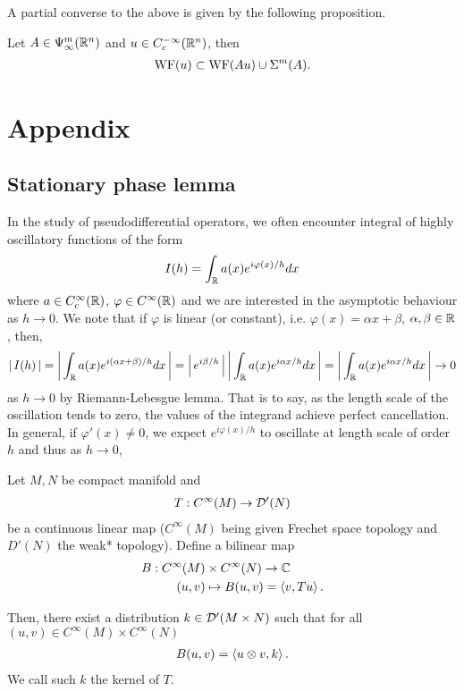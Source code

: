 \documentclass{article}
\begin{document}
A partial converse to the above is given by the following proposition. \\

\begin{fprop}
    Let $A \in \Psi^m_\infty(\R^n)$ and $u \in C^{- \infty}_c(\R^n)$, then 
    \begin{align*}
    \WF(u) \subset \WF(Au) \cup \Char^m(A).
    \end{align*}
\end{fprop}

\section{Appendix}
\subsection{Stationary phase lemma} 
In the study of pseudodifferential operators, we often encounter integral of highly oscillatory functions of the form
    \begin{align*}
    I(h) = \int_\R a(x) e^{i \varphi(x) /h} dx
    \end{align*}
where $a \in C^\infty_c(\R)$, $\varphi \in C^\infty(\R)$ and we are interested in the asymptotic behaviour as $h \to 0$. We note that if $\varphi$ is linear (or constant), i.e. $\varphi(x) = \alpha x+ \beta$, $\alpha, \beta \in \R$, then, 
\begin{align*}
   \abs{I(h)} = \abs{\int_\R a(x) e^{i (\alpha x + \beta) /h} dx} = \abs{e^{i \beta/h}} \abs{\int_\R a(x) e^{i \alpha x /h} dx} =  \abs{\int_\R a(x) e^{i \alpha x /h} dx} \to 0
\end{align*}
as $h \to 0$ by Riemann-Lebesgue lemma. That is to say, as the length scale of the oscillation tends to zero, the values of the integrand achieve perfect cancellation. In general, if $\varphi'(x) \neq 0$, we expect $e^{i\varphi(x)/h}$ to oscillate at length scale of order $h$ and thus as $h \to 0$, 





\begin{ftheorem} Let $M, N$ be compact manifold and 
    \begin{align*}
    T: C^\infty(M) \to \D'(N) \\
    \end{align*}
    be a continuous linear map ($C^\infty(M)$ being given Frechet space topology and $D'(N)$ the weak* topology). Define a bilinear map 
    \begin{align*}
    B: C^\infty(M) &\times C^\infty(N) \to \C \\
    (u, v) &\mapsto B(u, v) = \inprod[v, Tu]. 
    \end{align*}
    
    Then, there exist a distribution $k \in \D'(M \times N)$ such that for all $(u, v) \in C^\infty(M) \times C^\infty(N)$
    \begin{align*}
    B(u, v) = \inprod[u \otimes v, k]. 
    \end{align*}
    We call such $k$ the kernel of $T$. 
\end{ftheorem}




\end{document}
